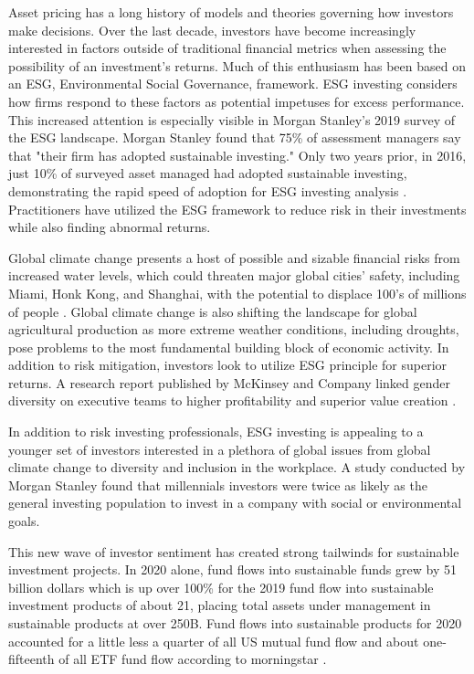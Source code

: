 Asset pricing has a long history of models and theories governing how investors make decisions. Over the last decade, investors have become increasingly interested in factors outside of traditional financial metrics when assessing the possibility of an investment's returns. Much of this enthusiasm has been based on an ESG, Environmental Social Governance, framework. ESG investing considers how firms respond to these factors as potential impetuses for excess performance. This increased attention is especially visible in Morgan Stanley's 2019 survey of the ESG landscape. Morgan Stanley  found that 75\% of assessment managers say that "their firm has adopted sustainable investing." Only two years prior, in 2016, just 10\% of surveyed asset managed had adopted sustainable investing, demonstrating the rapid speed of adoption for ESG investing analysis \cite{morgan_stanley_sustainable_2019}. Practitioners have utilized the ESG framework to reduce risk in their investments while also finding abnormal returns.

Global climate change presents a host of possible and sizable financial risks from increased water levels, which could threaten major global cities' safety, including Miami, Honk Kong, and Shanghai, with the potential to displace 100's of millions of people \cite{holder_three-degree_nodate}. Global climate change is also shifting the landscape for global agricultural production as more extreme weather conditions, including droughts, pose problems to the most fundamental building block of economic activity. In addition to risk mitigation, investors look to utilize ESG principle for superior returns. A research report published by McKinsey and Company linked gender diversity on executive teams to higher profitability and superior value creation \cite{mckinsey_diversity}.

In addition to risk investing professionals, ESG investing is appealing to a younger set of investors interested in a plethora of global issues from global climate change to diversity and inclusion in the workplace. A study conducted by Morgan Stanley found that millennials investors were twice as likely as the general investing population to invest in a company with social or environmental goals.

This new wave of investor sentiment has created strong tailwinds for sustainable investment projects. In 2020 alone, fund flows into sustainable funds grew by 51 billion dollars which is up over 100\% for the 2019 fund flow into sustainable investment products of about 21, placing total assets under management in sustainable products at over 250B. Fund flows into sustainable products for 2020 accounted for a little less a quarter of all US mutual fund flow and about one-fifteenth of all ETF fund flow according to morningstar \cite{monring_star_ESG}.

